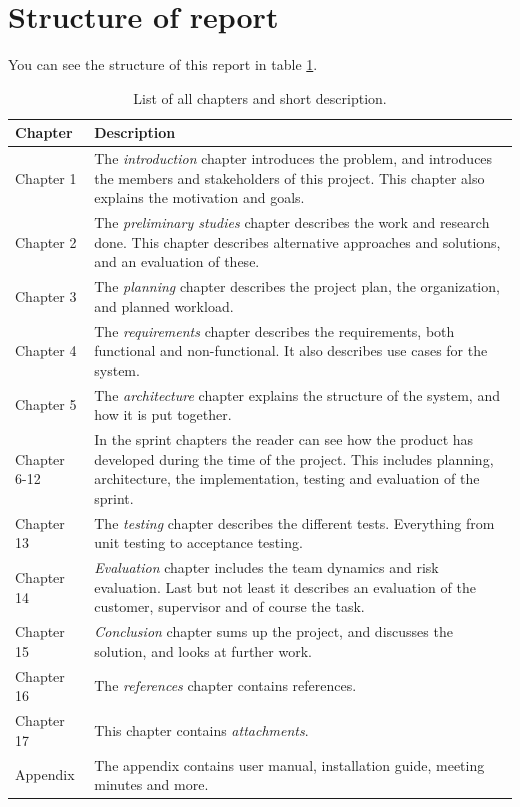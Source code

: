 \section{Structure of report}
You can see the structure of this report in table \ref{tab:structure_of_report}.
\begin{table}[!ht]\centering
\caption{List of all chapters and short description. }
\label{tab:structure_of_report}
\def\arraystretch{1.3}
\begin{tabularx}{\textwidth}{lX} \toprule[1mm]
\textbf{Chapter} & \textbf{Description} \\ \midrule
Chapter 1 & The \emph{introduction} chapter introduces the problem, and introduces the members and stakeholders of this project.
This chapter also explains the motivation and goals. \\

Chapter 2 &  The \emph{preliminary studies} chapter describes the work and research done. This chapter describes alternative approaches and solutions, and an evaluation of these. \\

Chapter 3 &  The \emph{planning} chapter describes the project plan, the organization, and planned workload.  \\

Chapter 4 &  The \emph{requirements} chapter describes the requirements, both functional and non-functional. It also describes use cases for the system. \\

Chapter 5	 &  The \emph{architecture} chapter explains the structure of the system, and how it is put together. \\

Chapter 6-12 	&  In the sprint chapters the reader can see how the product has developed during the time of the project. This includes planning, architecture, the implementation, testing and evaluation of the sprint. \\

Chapter 13 	 &  The \emph{testing} chapter describes the different tests. Everything from unit testing to acceptance testing. \\

Chapter 14 	 &  \emph{Evaluation} chapter includes the team dynamics and risk evaluation. Last but not least it describes an evaluation of the customer, supervisor and of course the task. \\

Chapter 15 	 &  \emph{Conclusion} chapter sums up the project, and discusses the solution, and looks at further work. \\

Chapter 16 	 &  The \emph{references} chapter contains references. \\

Chapter 17 	 &  This chapter contains \emph{attachments}. \\
\midrule
Appendix 	 &   The appendix contains user manual, installation guide, meeting minutes and more.\\

\bottomrule[1mm]
\end{tabularx}
\end{table}

